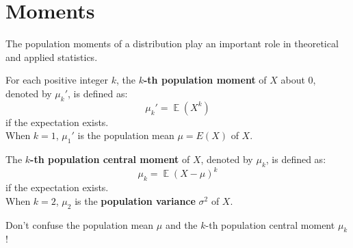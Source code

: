 \documentclass{huhtakm-template-book-v2}
\DeclareMathOperator{\E}{\mathbb{E}}
\begin{document}
\section{Moments}
The population moments of a distribution play an important role in theoretical and applied statistics.
\begin{defn}
	For each positive integer $k$, the \textbf{$k$-th population moment} of $X$ about $0$, denoted by $\mu_{k}'$, is defined as:
	\begin{equation*}
		\mu_{k}'=\E(X^{k})
	\end{equation*}
	if the expectation exists.\\
	When $k=1$, $\mu_{1}'$ is the population mean $\mu=E(X)$ of $X$.
\end{defn}
\begin{defn}
	The \textbf{$k$-th population central moment} of $X$, denoted by $\mu_{k}$, is defined as:
	\begin{equation*}
		\mu_{k}=\E(X-\mu)^{k}
	\end{equation*}
	if the expectation exists.\\
	When $k=2$, $\mu_{2}$ is the \textbf{population variance} $\sigma^{2}$ of $X$.
\end{defn}
\begin{rem}
	Don't confuse the population mean $\mu$ and the $k$-th population central moment $\mu_{k}$!
\end{rem}
\end{document}
